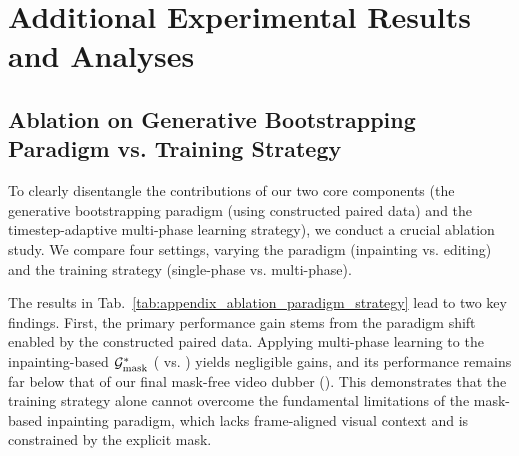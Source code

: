 \section{Additional Experimental Results and Analyses}
\subsection{Ablation on Generative Bootstrapping Paradigm vs. Training Strategy}
To clearly disentangle the contributions of our two core components (the generative bootstrapping paradigm (using constructed paired data) and the timestep-adaptive multi-phase learning strategy), we conduct a crucial ablation study. We compare four settings, varying the paradigm (inpainting vs. editing) and the training strategy (single-phase vs. multi-phase).


\begin{table}[h]
\centering
\caption{Ablation study disentangling the contributions of the paradigm (inpainting vs. editing) and the training strategy (single-phase vs. multi-phase). Best results are in \textbf{bold}.}
\label{tab:appendix_ablation_paradigm_strategy}
\end{table}

The results in Tab.~\ref{tab:appendix_ablation_paradigm_strategy} lead to two key findings. First, the primary performance gain stems from the paradigm shift enabled by the constructed paired data. Applying multi-phase learning to the inpainting-based $\mathcal{G}_{\text{mask}}^*$ (\textbf{} vs. \textbf{}) yields negligible gains, and its performance remains far below that of our final mask-free video dubber (\textbf{}). This demonstrates that the training strategy alone cannot overcome the fundamental limitations of the mask-based inpainting paradigm, which lacks frame-aligned visual context and is constrained by the explicit mask.

